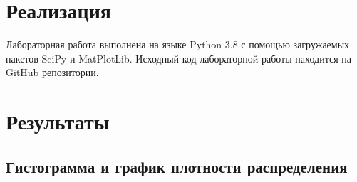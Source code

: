 \documentclass[12pt,a4paper]{article}
\begin{document}
	\section{Реализация}
	Лабораторная работа выполнена на языке Python 3.8 с помощью загружаемых пакетов SciPy и MatPlotLib. Исходный код лабораторной работы находится на GitHub репозитории.
	\newpage
	
	\section{Результаты}
	\subsection{Гистограмма и график плотности распределения}
	
\end{document}

